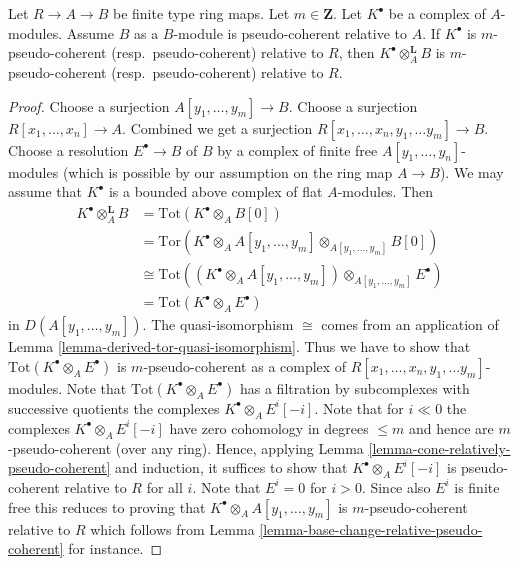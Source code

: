 \begin{lemma}
\label{lemma-pull-relative-pseudo-coherent}
Let $R \to A \to B$ be finite type ring maps.
Let $m \in \mathbf{Z}$.
Let $K^\bullet$ be a complex of $A$-modules.
Assume $B$ as a $B$-module is pseudo-coherent relative to $A$.
If $K^\bullet$ is $m$-pseudo-coherent (resp.\ pseudo-coherent)
relative to $R$, then $K^\bullet \otimes_A^{\mathbf{L}} B$ is
$m$-pseudo-coherent (resp.\ pseudo-coherent) relative to $R$.
\end{lemma}

\begin{proof}
Choose a surjection $A[y_1, \ldots, y_m] \to B$.
Choose a surjection $R[x_1, \ldots, x_n] \to A$.
Combined we get a surjection $R[x_1, \ldots, x_n, y_1, \ldots y_m] \to B$.
Choose a resolution $E^\bullet \to B$ of $B$ by a complex of
finite free $A[y_1, \ldots, y_n]$-modules (which is possible
by our assumption on the ring map $A \to B$). We may assume
that $K^\bullet$ is a bounded above complex of flat $A$-modules. Then
\begin{align*}
K^\bullet \otimes_A^{\mathbf{L}} B & =
\text{Tot}(K^\bullet \otimes_A B[0]) \\
& = \text{Tor}(K^\bullet \otimes_A A[y_1, \ldots, y_m]
\otimes_{A[y_1, \ldots, y_m]} B[0]) \\
& \cong
\text{Tot}\left(
(K^\bullet \otimes_A A[y_1, \ldots, y_m])
\otimes_{A[y_1, \ldots, y_m]} E^\bullet
\right) \\
& =
\text{Tot}(K^\bullet \otimes_A E^\bullet)
\end{align*}
in $D(A[y_1, \ldots, y_m])$. The quasi-isomorphism $\cong$ comes from
an application of
Lemma \ref{lemma-derived-tor-quasi-isomorphism}.
Thus we have to show that
$\text{Tot}(K^\bullet \otimes_A E^\bullet)$ is $m$-pseudo-coherent
as a complex of $R[x_1, \ldots, x_n, y_1, \ldots y_m]$-modules.
Note that $\text{Tot}(K^\bullet \otimes_A E^\bullet)$ has a filtration by
subcomplexes with successive quotients the complexes
$K^\bullet \otimes_A E^i[-i]$. Note that for $i \ll 0$ the
complexes $K^\bullet \otimes_A E^i[-i]$ have zero cohomology
in degrees $\leq m$ and hence are $m$-pseudo-coherent (over any ring).
Hence, applying
Lemma \ref{lemma-cone-relatively-pseudo-coherent}
and induction, it suffices to show that $K^\bullet \otimes_A E^i[-i]$ is
pseudo-coherent relative to $R$ for all $i$. Note that $E^i = 0$ for
$i > 0$. Since also $E^i$ is finite free this
reduces to proving that $K^\bullet \otimes_A A[y_1, \ldots, y_m]$ is
$m$-pseudo-coherent relative to $R$ which follows from
Lemma \ref{lemma-base-change-relative-pseudo-coherent}
for instance.
\end{proof}

